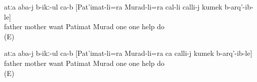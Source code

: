 \begin{exe}
	\ex	\label{ex:‎The parents want that Patimat and Murad help each other}
	\begin{xlist}
		\ex	\label{ex:‎The parents want that Patimat and Murad help each other@A}
		\gll	atːa	aba-j	b-ikː-ul	ca-b	[Pat'imat-li=ra	Murad-li=ra	cal-li	calli-j	kumek	b-arq'-ib-le]\\
			father	mother	want		Patimat\tsc{-erg=add}	Murad	one	one	help	do\\
		\glt	{} (E)

		\ex	\label{ex:‎The parents want that Patimat and Murad help each other@B}
		\gll	atːa	aba-j	b-ikː-ul	ca-b	[Pat'imat-li=ra	Murad-li=ra	ca	calli-j	kumek	b-arq'-ib-le]\\
			father	mother	want		Patimat\tsc{-erg=add}	Murad	one	one	help	do\\
		\glt	{} (E)
	\end{xlist}
\end{exe}
